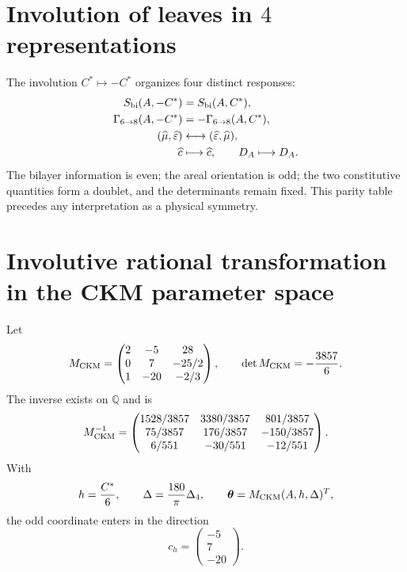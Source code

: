 \section{Involution of leaves in \(4\) representations}

The involution \(C^*\mapsto-C^*\) organizes four distinct responses:
\begin{equation}
\label{eq:modular-sheet-parities}
\begin{aligned}
S_{\rm bi}(A,-C^*)&=S_{\rm bi}(A,C^*),\\
\Gamma_{6\to8}(A,-C^*)&=-\Gamma_{6\to8}(A,C^*),\\
(\widehat\mu,\widehat\varepsilon)&\longleftrightarrow
(\widehat\varepsilon,\widehat\mu),\\
\widehat c&\longmapsto\widehat c,
\qquad D_A\longmapsto D_A.
\end{aligned}
\end{equation}
The bilayer information is even; the areal orientation is odd; the two
constitutive quantities form a doublet, and the determinants remain fixed. This parity
table precedes any interpretation as a physical symmetry.

\section{Involutive rational transformation in the CKM parameter space}

Let
\begin{equation}
\label{eq:modular-Mckm}
M_{\rm CKM}=
\begin{pmatrix}
2&-5&28\\
0&7&-25/2\\
1&-20&-2/3
\end{pmatrix},
\qquad
\det M_{\rm CKM}=-\frac{3857}{6}.
\end{equation}
The inverse exists on \(\mathbb Q\) and is
\begin{equation}
\label{eq:modular-Mckm-inverse}
M_{\rm CKM}^{-1}=
\begin{pmatrix}
1528/3857&3380/3857&801/3857\\
75/3857&176/3857&-150/3857\\
6/551&-30/551&-12/551
\end{pmatrix}.
\end{equation}
With
\begin{equation}
\label{eq:modular-ckm-coordinates}
h=\frac{C^*}{6},
\qquad
\Delta=\frac{180}{\pi}\Delta_4,
\qquad
\boldsymbol\theta=M_{\rm CKM}(A,h,\Delta)^T,
\end{equation}
the odd coordinate enters in the direction
\begin{equation}
\label{eq:modular-ch}
c_h=\begin{pmatrix}-5\\7\\-20\end{pmatrix}.
\end{equation}

